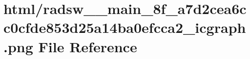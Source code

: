 \hypertarget{radsw____main__8f__a7d2cea6cc0cfde853d25a14ba0efcca2__icgraph_8png}{}\section{html/radsw\+\_\+\+\_\+main\+\_\+8f\+\_\+a7d2cea6cc0cfde853d25a14ba0efcca2\+\_\+icgraph.png File Reference}
\label{radsw____main__8f__a7d2cea6cc0cfde853d25a14ba0efcca2__icgraph_8png}
